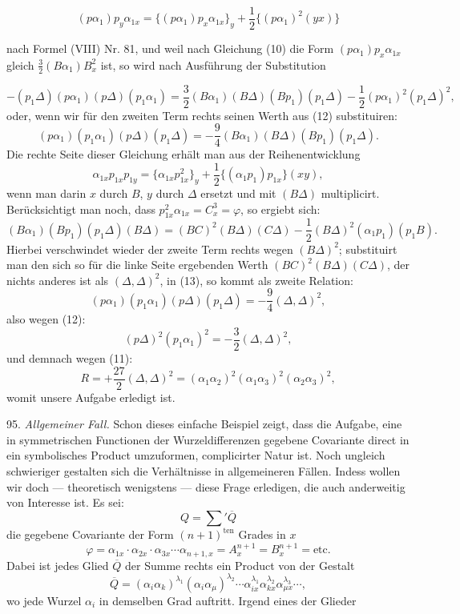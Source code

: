 \documentclass[11pt]{article}
\providecommand{\weberpage}[1]{}
\providecommand{\weq}[2]{\begin{equation}\tag{#1}#2\end{equation}}
\let\Delta\varDelta
\begin{document}
\[
(p\alpha_1)p_y\alpha_{1x}=\{(p\alpha_1)p_x\alpha_{1x}\}_y+\frac{1}{2}\{(p\alpha_1)^2(yx)\}
\]

nach Formel (VIII) Nr. 81, und weil nach Gleichung (10) die Form $(p\alpha_1)p_x\alpha_{1x}$ gleich $\frac{3}{2}(B\alpha_1)B_x^2$ ist, so wird nach Ausführung der Substitution


\weberpage{101}
\[
-(p_1\Delta)(p\alpha_1)(p\Delta)(p_1\alpha_1) = \frac{3}{2}(B\alpha_1)(B\Delta)(Bp_1)(p_1\Delta) - \frac{1}{2}(p\alpha_1)^2(p_1\Delta)^2,
\]
oder, wenn wir für den zweiten Term rechts seinen Werth aus (12)
substituiren:
\weq{13}{(p\alpha_1)(p_1\alpha_1)(p\Delta)(p_1\Delta) = -\frac{9}{4}(B\alpha_1)(B\Delta)(Bp_1)(p_1\Delta).}
Die rechte Seite dieser Gleichung erhält man aus der Reihenentwicklung
\[
\alpha_{1x}p_{1x}p_{1y} = \{\alpha_{1x}p_{1x}^2\}_y + \frac{1}{2}\{(\alpha_1p_1)p_{1x}\}(xy),
\]
wenn man darin $x$ durch $B$, $y$ durch $\Delta$ ersetzt und mit $(B\Delta)$ multiplicirt. Berücksichtigt man noch, dass $p_{1x}^2\alpha_{1x} = C_x^3 = \varphi$, so ergiebt sich:
\[
(B\alpha_1)(Bp_1)(p_1\Delta)(B\Delta) = (BC)^2(B\Delta)(C\Delta) - \frac{1}{2}(B\Delta)^2(\alpha_1p_1)(p_1B).
\]
Hierbei verschwindet wieder der zweite Term rechts wegen $(B\Delta)^2$; substituirt man den sich so für die linke Seite ergebenden Werth $(BC)^2(B\Delta)(C\Delta)$, der nichts anderes ist als $(\Delta,\Delta)^2$, in (13), so kommt als zweite Relation:
\weq{14}{(p\alpha_1)(p_1\alpha_1)(p\Delta)(p_1\Delta) = -\frac{9}{4}(\Delta,\Delta)^2,}
also wegen (12):
\[
(p\Delta)^2(p_1\alpha_1)^2 = -\frac{3}{2}(\Delta,\Delta)^2,
\]
und demnach wegen (11):
\weq{15}{R = +\frac{27}{2}(\Delta,\Delta)^2 = (\alpha_1\alpha_2)^2(\alpha_1\alpha_3)^2(\alpha_2\alpha_3)^2,}
womit unsere Aufgabe erledigt ist.

95. \textit{Allgemeiner Fall.} Schon dieses einfache Beispiel zeigt, dass die Aufgabe, eine in symmetrischen Functionen der Wurzeldifferenzen gegebene Covariante direct in ein symbolisches Product umzuformen, complicirter Natur ist. Noch ungleich schwieriger gestalten sich die Verhältnisse in allgemeineren Fällen. Indess wollen wir doch --- theoretisch wenigstens --- diese Frage erledigen, die auch anderweitig von Interesse ist. Es sei:
\[
Q = \sum{}' \overline{Q}
\]
die gegebene Covariante der Form $(n+1)^{\text{ten}}$ Grades in $x$
\[
\varphi = \alpha_{1x}\cdot\alpha_{2x}\cdot\alpha_{3x}\cdots\alpha_{n+1,x} = A_x^{n+1} = B_x^{n+1} = \text{etc.}
\]
Dabei ist jedes Glied $\overline{Q}$ der Summe rechts ein Product von der Gestalt
\[
\overline{Q} = (\alpha_i\alpha_k)^{\lambda_1}(\alpha_i\alpha_\mu)^{\lambda_2}\cdots\alpha_{ix}^{\lambda_1}\alpha_{kx}^{\lambda_2}\alpha_{\mu x}^{\lambda_3}\cdots,
\]
wo jede Wurzel $\alpha_i$ in demselben Grad auftritt. Irgend eines der Glieder
\end{document}
